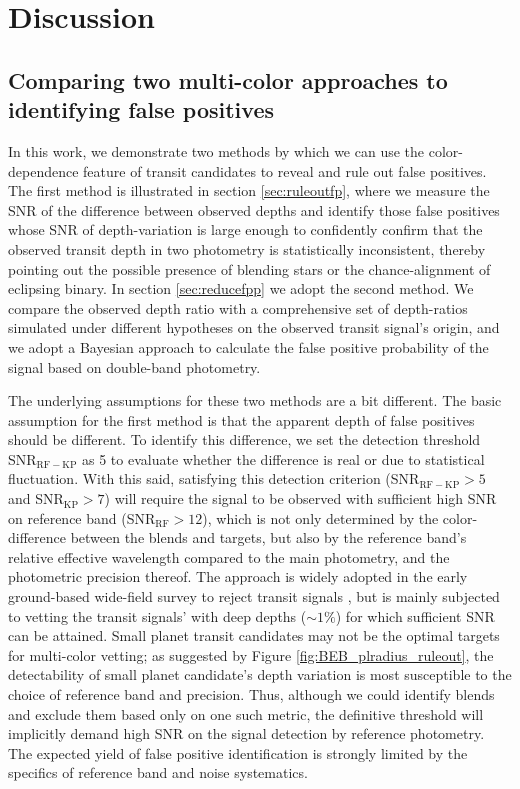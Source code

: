 \documentclass{aastex63}
\begin{document}
\section{Discussion}
\label{sec:discussion}
\subsection{Comparing two multi-color approaches to identifying false positives}

In this work, we demonstrate two methods by which we can use the color-dependence feature of transit candidates to reveal and rule out false positives. The first method is illustrated in section \ref{sec:ruleoutfp}, where we measure the SNR of the difference between observed depths and identify those false positives whose SNR of depth-variation is large enough to confidently confirm that the observed transit depth in two photometry is statistically inconsistent, thereby pointing out the possible presence of blending stars or the chance-alignment of eclipsing binary. In section \ref{sec:reducefpp} we adopt the second method. We compare the observed depth ratio with a comprehensive set of depth-ratios simulated under different hypotheses on the observed transit signal's origin, and we adopt a Bayesian approach to calculate the false positive probability of the signal based on double-band photometry.

The underlying assumptions for these two methods are a bit different. The basic assumption for the first method is that the apparent depth of false positives should be different. To identify this difference, we set the detection threshold SNR$_\mathrm{RF-KP}$ as 5 to evaluate whether the difference is real or due to statistical fluctuation. With this said, satisfying this detection criterion (SNR$_\mathrm{RF-KP} > 5$ and SNR$_\mathrm{KP}>7$) will require the signal to be observed with sufficient high SNR on reference band (SNR$_\mathrm{RF} > 12$), which is not only determined by the color-difference between the blends and targets, but also by the reference band's relative effective wavelength compared to the main photometry, and the photometric precision thereof. The approach is widely adopted in the early ground-based wide-field survey to reject transit signals \citep{ODonovan2006, Colon2012}, but is mainly subjected to vetting the transit signals' with deep depths ($\sim 1\%$) for which sufficient SNR can be attained. Small planet transit candidates may not be the optimal targets for multi-color vetting; as suggested by Figure \ref{fig:BEB_plradius_ruleout}, the detectability of small planet candidate's depth variation is most susceptible to the choice of reference band and precision. Thus, although we could identify blends and exclude them based only on one such metric, the definitive threshold will implicitly demand high SNR on the signal detection by reference photometry. The expected yield of false positive identification is strongly limited by the specifics of reference band and noise systematics.
\end{document}
